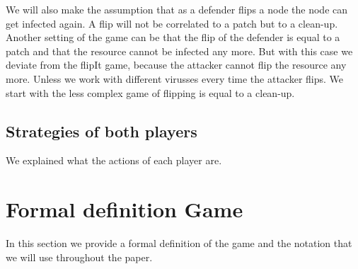 We will also make the assumption that as a defender flips a node the node can get infected again. A flip will not be  correlated to a patch but to a clean-up. 
 Another setting of the game can be that the flip of the defender is equal to a patch and that the resource cannot be infected any more. But with this case we deviate from the flipIt game, because the attacker cannot flip the resource any more. Unless we work with different virusses every time the attacker flips. We start with the less complex game of flipping is equal to a clean-up.

\subsection{Strategies of both players}
We explained what the actions of each player are. 

\section{Formal definition Game}

In this section we provide a formal definition of the game and the notation that we will use throughout the paper. 

